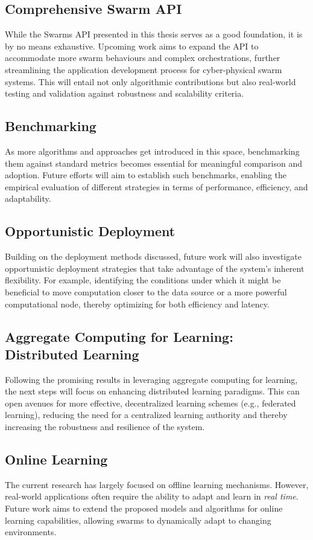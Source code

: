 \subsection*{Comprehensive Swarm API}
While the Swarms API presented in this thesis serves as a good foundation, it is by no means exhaustive. 
 Upcoming work aims to expand the API to accommodate more swarm behaviours and complex orchestrations, 
 further streamlining the application development process for cyber-physical swarm systems. 
 This will entail not only algorithmic contributions but also real-world testing and validation against robustness and scalability criteria.

\subsection*{Benchmarking}
As more algorithms and approaches get introduced in this space, benchmarking them against standard metrics becomes essential for meaningful comparison and adoption. 
 Future efforts will aim to establish such benchmarks, enabling the empirical evaluation of different strategies in terms of performance, efficiency, and adaptability.

\subsection*{Opportunistic Deployment}
Building on the deployment methods discussed,
 future work will also investigate opportunistic deployment strategies that take advantage of the system's inherent flexibility. 
 For example, identifying the conditions under which it might be beneficial to move computation closer to the data source or a more powerful computational node, 
 thereby optimizing for both efficiency and latency.

\subsection*{Aggregate Computing for Learning: Distributed Learning}
Following the promising results in leveraging aggregate computing for learning, 
 the next steps will focus on enhancing distributed learning paradigms. 
 This can open avenues for more effective, decentralized learning schemes (e.g., federated learning), 
 reducing the need for a centralized learning authority and thereby increasing the robustness and resilience of the system.

\subsection*{Online Learning}
The current research has largely focused on offline learning mechanisms. 
 However, real-world applications often require the ability to adapt and learn in \emph{real time}. 
 Future work aims to extend the proposed models and algorithms for online learning capabilities, 
 allowing swarms to dynamically adapt to changing environments.

